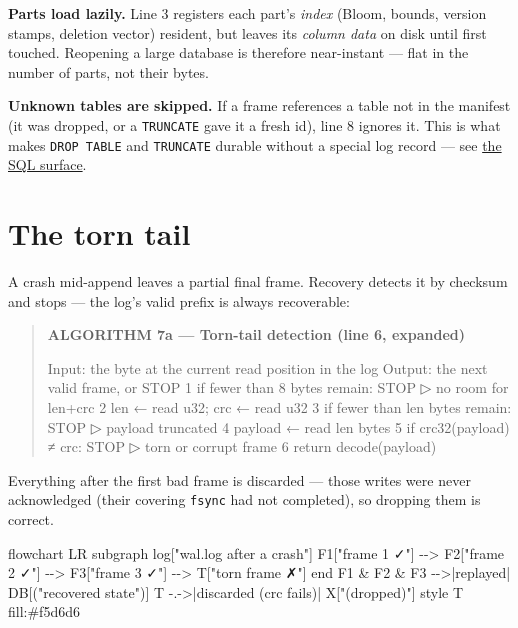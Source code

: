 \documentclass[
  11pt,
  openany]{book}
\newenvironment{Shaded}{}{}
\newcommand{\NormalTok}[1]{#1}
\begin{document}
\textbf{Parts load lazily.} Line 3 registers each part's \emph{index}
(Bloom, bounds, version stamps, deletion vector) resident, but leaves
its \emph{column data} on disk until first touched. Reopening a large
database is therefore near-instant --- flat in the number of parts, not
their bytes.

\textbf{Unknown tables are skipped.} If a frame references a table not
in the manifest (it was dropped, or a \texttt{TRUNCATE} gave it a fresh
id), line 8 ignores it. This is what makes \texttt{DROP\ TABLE} and
\texttt{TRUNCATE} durable without a special log record --- see
\href{../getting-started/getting-started.md}{the SQL surface}.

\section{The torn tail}\label{the-torn-tail}

A crash mid-append leaves a partial final frame. Recovery detects it by
checksum and stops --- the log's valid prefix is always recoverable:

\begin{quote}
\textbf{ALGORITHM 7a --- Torn-tail detection (line 6, expanded)}

\begin{Shaded}
\begin{Highlighting}[]
\NormalTok{Input:  the byte at the current read position in the log}
\NormalTok{Output: the next valid frame, or STOP}
\NormalTok{1  if fewer than 8 bytes remain: STOP                 ▷ no room for len+crc}
\NormalTok{2  len ← read u32;  crc ← read u32}
\NormalTok{3  if fewer than len bytes remain: STOP               ▷ payload truncated}
\NormalTok{4  payload ← read len bytes}
\NormalTok{5  if crc32(payload) ≠ crc: STOP                       ▷ torn or corrupt frame}
\NormalTok{6  return decode(payload)}
\end{Highlighting}
\end{Shaded}
\end{quote}

Everything after the first bad frame is discarded --- those writes were
never acknowledged (their covering \texttt{fsync} had not completed), so
dropping them is correct.

\begin{Shaded}
\begin{Highlighting}[]
\NormalTok{flowchart LR}
\NormalTok{    subgraph log["wal.log after a crash"]}
\NormalTok{      F1["frame 1 ✓"] {-}{-}\textgreater{} F2["frame 2 ✓"] {-}{-}\textgreater{} F3["frame 3 ✓"] {-}{-}\textgreater{} T["torn frame ✗"]}
\NormalTok{    end}
\NormalTok{    F1 \& F2 \& F3 {-}{-}\textgreater{}|replayed| DB[("recovered state")]}
\NormalTok{    T {-}.{-}\textgreater{}|discarded (crc fails)| X["(dropped)"]}
\NormalTok{    style T fill:\#f5d6d6}
\end{Highlighting}
\end{Shaded}
\end{document}
